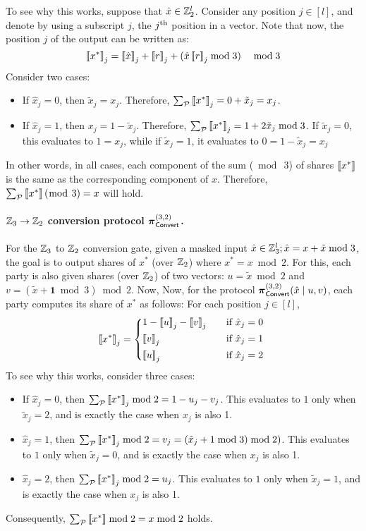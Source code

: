 \noindent To see why this works, suppose that $\hat{x} \in \mathbb{Z}_2^l$. Consider any position $j \in [l]$, and denote by using a subscript $j$, the $j^{\textnormal{th}}$ position in a vector. Note that now, the position $j$ of the output can be written as:
\[
    \left\llbracket x^* \right\rrbracket_j = \left\llbracket \hat{x} \right\rrbracket_j + \left\llbracket r \right\rrbracket_j + (\hat{x}\left\llbracket r \right\rrbracket_j\bmod 3) \quad \bmod 3
\]
Consider two cases:
\begin{itemize}
\item If $\hat{x}_j = 0$, then $\tilde{x}_j = x_j$. Therefore, $\sum_{\mathcal{P}} \left\llbracket x^* \right\rrbracket_j = 0 + \tilde{x}_j = x_j$.

\item If $\hat{x}_j = 1$, then $x_j = 1 - \tilde{x}_j$. Therefore, $\sum_{\mathcal{P}} \left\llbracket x^* \right\rrbracket_j = 1 + 2\tilde{x}_j \bmod 3$. If $\tilde{x}_j = 0$, this evaluates to $1 = x_j$, while if $\tilde{x}_j = 1$, it evaluates to $0 = 1 - \tilde{x}_j = x_j$
\end{itemize}
In other words, in all cases, each component of the sum ($\bmod~3$) of shares $\left\llbracket x^* \right\rrbracket$ is the same as the corresponding component of $x$. Therefore, $\sum_{\mathcal{P}} \left\llbracket x^* \right\rrbracket (\bmod~3) = x$ will hold.


\paragraph{$\mathbb{Z}_3 \to \mathbb{Z}_2$ conversion protocol $\boldsymbol{\pi}_{\textsf{Convert}}^{(3,2)}$.}
For the $\mathbb{Z}_3$ to $\mathbb{Z}_2$ conversion gate, given a masked input $\hat{x} \in \mathbb{Z}_3^l; \hat{x} = x + \tilde{x} \bmod 3$, the goal is to output shares of $x^*$ (over $\mathbb{Z}_2$) where $x^*  = x \bmod 2$. For this, each party is also given shares (over $\mathbb{Z}_2$) of two vectors: $u = \tilde{x} \bmod 2$ and $v = (\tilde{x} + \textbf{1} \bmod 3) \bmod 2$. Now,  Now, for the protocol $\boldsymbol{\pi}_{\textsf{Convert}}^{(3,2)}(\hat{x} \mid u, v)$, each party computes its share of $x^*$ as follows: For each position $j \in [l]$,
\[
\share{x^*}_j = 
\begin{cases*}
       1 - \share{u}_j - \share{v}_j  & \quad if $\hat{x}_j = 0$ \\
       \share{v}_j & \quad if $\hat{x}_j = 1$ \\
       \share{u}_j & \quad if $\hat{x}_j = 2$
\end{cases*}
\]
To see why this works, consider three cases:
\begin{itemize}
\item If $\hat{x}_j = 0$, then $\sum_{\mathcal{P}} \left\llbracket x^* \right\rrbracket_j \bmod 2 = 1 - u_j - v_j$. This evaluates to $1$ only when $\tilde{x}_j = 2$, and is exactly the case when $x_j$ is also 1.

\item $\hat{x}_j = 1$, then $\sum_{\mathcal{P}} \left\llbracket x^* \right\rrbracket_j \bmod 2 = v_j = (\tilde{x}_j + 1 \bmod 3) \bmod 2)$. This evaluates to $1$ only when $\tilde{x}_j = 0$, and is exactly the case when $x_j$ is also 1.

\item $\hat{x}_j = 2$, then $\sum_{\mathcal{P}} \left\llbracket x^* \right\rrbracket_j \bmod 2 = u_j$. This evaluates to $1$ only when $\tilde{x}_j = 1$, and is exactly the case when $x_j$ is also 1.
\end{itemize}
Consequently, $\sum_{\mathcal{P}} \left\llbracket x^* \right\rrbracket \bmod 2 = x \bmod 2$ holds.


